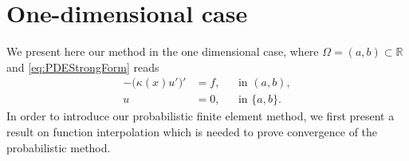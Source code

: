 \documentclass{siamart1116}
\numberwithin{theorem}{section}
\newcommand{\R}{\mathbb{R}}
\begin{document}
\section{One-dimensional case} We present here our method in the one dimensional case, where $\Omega = (a, b) \subset \R$ and \eqref{eq:PDEStrongForm} reads
\begin{equation}\label{eq:PDEStrongForm1d}
\begin{aligned}
	-\big(\kappa(x)u'\big)' &= f, && \text{in } (a, b),\\
	u &= 0, && \text{in } \{a, b\}.
\end{aligned}
\end{equation}	
In order to introduce our probabilistic finite element method, we first present a result on function interpolation which is needed to prove convergence of the probabilistic method.
\end{document}

